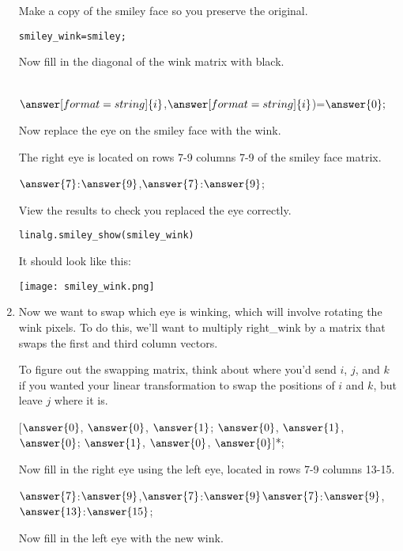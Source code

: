 \documentclass{ximera}
\begin{document}
\begin{problem}
\begin{enumerate}
Make a copy of the smiley face so you preserve the original.
\begin{verbatim}
smiley_wink=smiley;
\end{verbatim}

Now fill in the diagonal of the wink matrix with black.

 \\
$\answer[format=string]{i}$,$\answer[format=string]{i}$)=$\answer{0};$\\

Now replace the eye on the smiley face with the wink.
\begin{hint}
The right eye is located on rows 7-9 columns 7-9 of the smiley face matrix.
\end{hint}

$\answer{7}$:$\answer{9}$,$\answer{7}$:$\answer{9}$;

View the results to check you replaced the eye correctly.
\begin{verbatim}
linalg.smiley_show(smiley_wink)
\end{verbatim}

It should look like this:
\begin{center}
\texttt{[image: smiley\_wink.png]}
\end{center}

\item Now we want to swap which eye is winking, which will involve rotating the wink pixels. To do this, we'll want to multiply right\_wink by a matrix that swaps the first and third column vectors. 

To figure out the swapping matrix, think about where you'd send $i$, $j$, and $k$ if you wanted your linear transformation to swap the positions of $i$ and $k$, but leave $j$ where it is.

[$\answer{0}$, $\answer{0}$, $\answer{1}$; $\answer{0}$, $\answer{1}$, $\answer{0}$; $\answer{1}$, $\answer{0}$, $\answer{0}$]*;

Now fill in the right eye using the left eye, located in rows 7-9 columns 13-15.

$\answer{7}$:$\answer{9}$,$\answer{7}$:$\answer{9}$$\answer{7}$:$\answer{9}$,$\answer{13}$:$\answer{15}$\mtlb{)};

Now fill in the left eye with the new wink.


\end{enumerate}
\end{problem}
\end{document}
